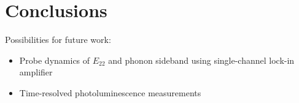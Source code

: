 \chapter{Conclusions}

Possibilities for future work:
\begin{itemize}
  \item Probe dynamics of $E_{22}$ and phonon sideband using single-channel lock-in amplifier
  \item Time-resolved photoluminescence measurements \cite{murakami2009existence}
\end{itemize}
